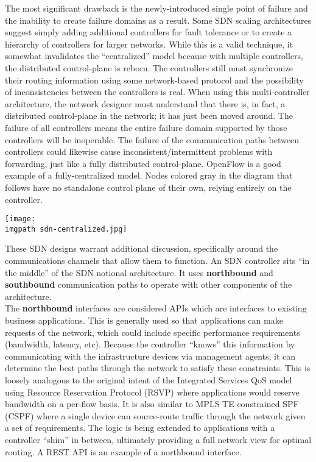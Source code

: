 \begin{enumerate}
  The most significant drawback is the newly-introduced single point of
  failure and the inability to create failure domains as a result. Some SDN
  scaling architectures suggest simply adding additional controllers for fault
  tolerance or to create a hierarchy of controllers for larger networks. While
  this is a valid technique, it somewhat invalidates the ``centralized'' model
  because with multiple controllers, the distributed control-plane is reborn.
  The controllers still must synchronize their routing information using some
  network-based protocol and the possibility of inconsistencies between the
  controllers is real. When using this multi-controller architecture, the
  network designer must understand that there is, in fact, a distributed
  control-plane in the network; it has just been moved around. The failure of
  all controllers means the entire failure domain supported by those
  controllers will be inoperable. The failure of the communication paths
  between controllers could likewise cause inconsistent/intermittent problems
  with forwarding, just like a fully distributed control-plane. OpenFlow is a
  good example of a fully-centralized model. Nodes colored gray in the diagram
  that follows have no standalone control plane of their own, relying
  entirely on the controller.

    \begin{minipage}[t]{\linewidth}
	  \centering
      \texttt{[image: \\imgpath sdn-centralized.jpg]}
    \end{minipage}
\end{enumerate}

These SDN designs warrant additional discussion, specifically around the
communications channels that allow them to function. An SDN controller sits
``in the middle'' of the SDN notional architecture. It uses \textbf{northbound}
and \textbf{southbound} communication paths to operate with other components
of the architecture. \\

The \textbf{northbound} interfaces are considered APIs which are interfaces to existing
business applications. This is generally used so that applications can make
requests of the network, which could include specific performance requirements
(bandwidth, latency, etc). Because the controller ``knows'' this information
by communicating with the infrastructure devices via management agents, it can
determine the best paths through the network to satisfy these constraints.
This is loosely analogous to the original intent of the Integrated Services
QoS model using Resource Reservation Protocol (RSVP) where applications would
reserve bandwidth on a per-flow basis. It is also similar to MPLS TE
constrained SPF (CSPF) where a single device can source-route traffic through
the network given a set of requirements. The logic is being extended to
applications with a controller ``shim'' in between, ultimately providing a
full network view for optimal routing. A REST API is an example of a
northbound interface. \\

